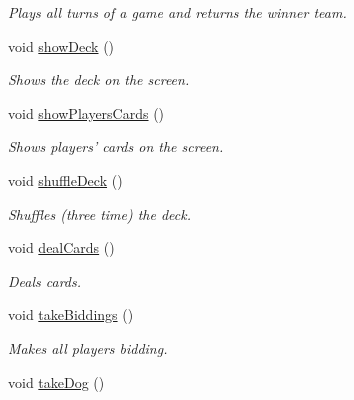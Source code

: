 \begin{DoxyCompactItemize}
\begin{DoxyCompactList}\small\item\em \-Plays all turns of a game and returns the winner team. \end{DoxyCompactList}\item 
\hypertarget{classGame_ae53579403950f816d662454021f6d460}{void \hyperlink{classGame_ae53579403950f816d662454021f6d460}{show\-Deck} ()}\label{classGame_ae53579403950f816d662454021f6d460}

\begin{DoxyCompactList}\small\item\em \-Shows the deck on the screen. \end{DoxyCompactList}\item 
\hypertarget{classGame_a280383798308721f9655dbf509dbc050}{void \hyperlink{classGame_a280383798308721f9655dbf509dbc050}{show\-Players\-Cards} ()}\label{classGame_a280383798308721f9655dbf509dbc050}

\begin{DoxyCompactList}\small\item\em \-Shows players' cards on the screen. \end{DoxyCompactList}\item 
\hypertarget{classGame_a8eb0a092d23b426a8b4b03c4083b7afe}{void \hyperlink{classGame_a8eb0a092d23b426a8b4b03c4083b7afe}{shuffle\-Deck} ()}\label{classGame_a8eb0a092d23b426a8b4b03c4083b7afe}

\begin{DoxyCompactList}\small\item\em \-Shuffles (three time) the deck. \end{DoxyCompactList}\item 
\hypertarget{classGame_a234bc66c5663548d90368ecd142591b2}{void \hyperlink{classGame_a234bc66c5663548d90368ecd142591b2}{deal\-Cards} ()}\label{classGame_a234bc66c5663548d90368ecd142591b2}

\begin{DoxyCompactList}\small\item\em \-Deals cards. \end{DoxyCompactList}\item 
\hypertarget{classGame_ae8240e18a7b5ed1adec7663278afc256}{void \hyperlink{classGame_ae8240e18a7b5ed1adec7663278afc256}{take\-Biddings} ()}\label{classGame_ae8240e18a7b5ed1adec7663278afc256}

\begin{DoxyCompactList}\small\item\em \-Makes all players bidding. \end{DoxyCompactList}\item 
\hypertarget{classGame_ab725d07327db4dfb836e90eb08c83393}{void \hyperlink{classGame_ab725d07327db4dfb836e90eb08c83393}{take\-Dog} ()}\label{classGame_ab725d07327db4dfb836e90eb08c83393}


\end{DoxyCompactItemize}

